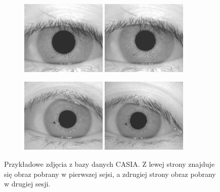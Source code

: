 \begin{figure}[h]
  \centering
  \begin{subfigure}[b]{\textwidth}
    \centering
    \includegraphics[width=0.45\textwidth]{images/experiment/CasiaExampleOneLeft.png}
    \includegraphics[width=0.45\textwidth]{images/experiment/CasiaExampleOneRight.png}
  \end{subfigure}
  \begin{subfigure}[b]{\textwidth}
    \centering
    \includegraphics[width=0.45\textwidth]{images/experiment/CasiaExampleTwoLeft.png}
    \includegraphics[width=0.45\textwidth]{images/experiment/CasiaExampleTwoRight.png}
  \end{subfigure}
  \caption{Przykładowe zdjęcia z bazy danych CASIA. Z lewej strony
  znajduje się obraz pobrany w pierwszej sejsi, a zdrugiej strony obraz pobrany w drugiej sesji.}
  \label{fig:casiaExample}
\end{figure}

